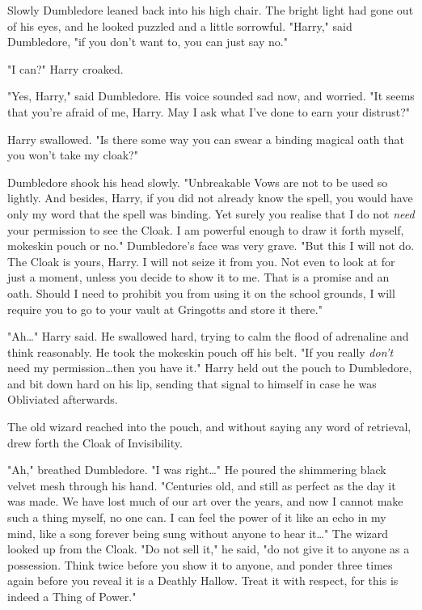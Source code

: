 Slowly Dumbledore leaned back into his high chair. The bright light had gone
out of his eyes, and he looked puzzled and a little sorrowful. "Harry," said
Dumbledore, "if you don’t want to, you can just say no."

"I can?" Harry croaked.

"Yes, Harry," said Dumbledore. His voice sounded sad now, and worried. "It
seems that you’re afraid of me, Harry. May I ask what I’ve done to earn your
distrust?"

Harry swallowed. "Is there some way you can swear a binding magical oath that
you won’t take my cloak?"

Dumbledore shook his head slowly. "Unbreakable Vows are not to be used so
lightly. And besides, Harry, if you did not already know the spell, you would
have only my word that the spell was binding. Yet surely you realise that I do
not \emph{need} your permission to see the Cloak. I am powerful enough to draw
it forth myself, mokeskin pouch or no." Dumbledore’s face was very grave. "But
this I will not do. The Cloak is yours, Harry. I will not seize it from you.
Not even to look at for just a moment, unless you decide to show it to me. That
is a promise and an oath. Should I need to prohibit you from using it on the
school grounds, I will require you to go to your vault at Gringotts and store
it there."

"Ah…" Harry said. He swallowed hard, trying to calm the flood of
adrenaline and think reasonably. He took the mokeskin pouch off his belt. "If
you really \emph{don’t} need my permission…then you have it." Harry
held out the pouch to Dumbledore, and bit down hard on his lip, sending that
signal to himself in case he was Obliviated afterwards.

The old wizard reached into the pouch, and without saying any word of
retrieval, drew forth the Cloak of Invisibility.

"Ah," breathed Dumbledore. "I was right…" He poured the shimmering black
velvet mesh through his hand. "Centuries old, and still as perfect as the day
it was made. We have lost much of our art over the years, and now I cannot make
such a thing myself, no one can. I can feel the power of it like an echo in my
mind, like a song forever being sung without anyone to hear it…" The
wizard looked up from the Cloak. "Do not sell it," he said, "do not give it to
anyone as a possession. Think twice before you show it to anyone, and ponder
three times again before you reveal it is a Deathly Hallow. Treat it with
respect, for this is indeed a Thing of Power."

